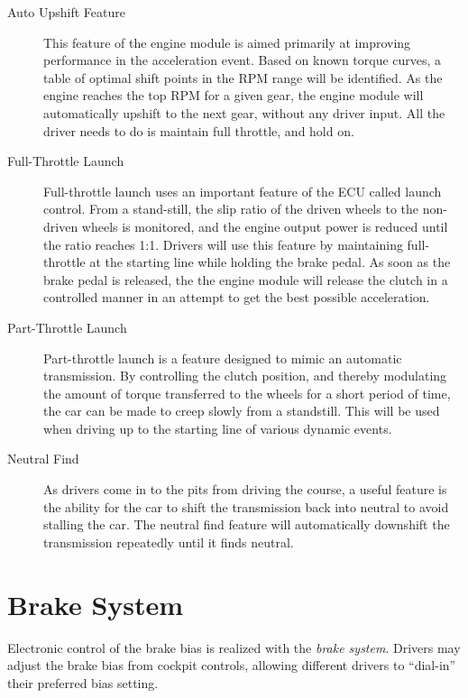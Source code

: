\begin{description}

\item[Auto Upshift Feature]
This feature of the engine module is aimed primarily at improving performance in the acceleration event. Based on known torque curves, a table of optimal shift points in the RPM range will be identified. As the engine reaches the top RPM for a given gear, the engine module will automatically upshift to the next gear, without any driver input. All the driver needs to do is maintain full throttle, and hold on.

\item[Full-Throttle Launch]
Full-throttle launch uses an important feature of the ECU called launch control. From a stand-still, the slip ratio of the driven wheels to the non-driven wheels is monitored, and the engine output power is reduced until the ratio reaches 1:1. Drivers will use this feature by maintaining full-throttle at the starting line while holding the brake pedal. As soon as the brake pedal is released, the the engine module will release the clutch in a controlled manner in an attempt to get the best possible acceleration.

\item[Part-Throttle Launch]
Part-throttle launch is a feature designed to mimic an automatic transmission. By controlling the clutch position, and thereby modulating the amount of torque transferred to the wheels for a short period of time, the car can be made to creep slowly from a standstill. This will be used when driving up to the starting line of various dynamic events.

\item[Neutral Find]
As drivers come in to the pits from driving the course, a useful feature is the ability for the car to shift the transmission back into neutral to avoid stalling the car. The neutral find feature will automatically downshift the transmission repeatedly until it finds neutral.

\end{description}

%
%

\section{Brake System}
\label{brake_system}

Electronic control of the brake bias is realized with the \emph{brake system}. Drivers may adjust the brake bias from cockpit controls, allowing different drivers to {}``dial-in'' their preferred bias setting. 

